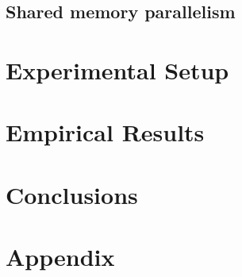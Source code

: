 \documentclass[sigconf,screen,natbib]{acmart}
\begin{document}
  \subsection{Shared memory parallelism} \label{s:par}    %

\section{Experimental Setup} \label{s:setup}    %

\section{Empirical Results} \label{s:results}  %

\section{Conclusions} \label{s:conclusion}    %


\newpage




\newpage
\section*{Appendix}  %
\end{document}
